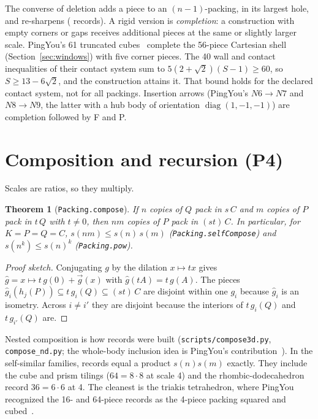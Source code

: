 \documentclass[11pt,a4paper]{article}
\newcommand{\code}[1]{\texttt{\nolinkurl{#1}}}
\newcommand{\lean}[1]{\texttt{#1}}
\newtheorem{theorem}{Theorem}
\theoremstyle{definition}
\theoremstyle{remark}
\begin{document}
The converse of deletion adds a piece to an $(n-1)$-packing, in its largest hole, and re-sharpens (\nAscend{} records). A rigid version is \emph{completion}: a construction with empty corners or gaps receives additional pieces at the same or slightly larger scale. PingYou's 61 truncated cubes~\cite{pingSixteen} complete the 56-piece Cartesian shell (Section~\ref{sec:windows}) with five corner pieces. The 40 wall and contact inequalities of their contact system sum to $5(2+\sqrt2)(S-1)\ge 60$, so $S\ge 13-6\sqrt2$, and the construction attains it. That bound holds for the declared contact system, not for all packings. Insertion arrows (PingYou's $N6\to N7$ and $N8\to N9$, the latter with a hub body of orientation $\operatorname{diag}(1,-1,-1)$) are completion followed by F and P.

\section{Composition and recursion (P4)}\label{sec:compose}

Scales are ratios, so they multiply.

\begin{theorem}[\lean{Packing.compose}]\label{thm:compose}
If $n$ copies of $Q$ pack in $s\,C$ and $m$ copies of $P$ pack in $t\,Q$ with $t\ne 0$, then $nm$ copies of $P$ pack in $(st)\,C$. In particular, for $K=P=Q=C$, $s(nm)\le s(n)\,s(m)$ (\lean{Packing.selfCompose}) and $s(n^k)\le s(n)^k$ (\lean{Packing.pow}).
\end{theorem}

\begin{proof}[Proof sketch]
Conjugating $g$ by the dilation $x\mapsto tx$ gives $\hat g=x\mapsto t\,g(0)+\vec g(x)$ with $\hat g(tA)=t\,g(A)$. The pieces $\hat g_i(h_j(P))\subseteq t\,g_i(Q)\subseteq (st)\,C$ are disjoint within one $g_i$ because $\hat g_i$ is an isometry. Across $i\ne i'$ they are disjoint because the interiors of $t\,g_i(Q)$ and $t\,g_{i'}(Q)$ are.
\end{proof}

Nested composition is how \nNested{} records were built (\code{scripts/compose3d.py}, \code{compose\_nd.py}; the whole-body inclusion idea is PingYou's contribution~\cite{ping79}). In the self-similar families, \nComposites{} records equal a product $s(n)s(m)$ exactly. They include the cube and prism tilings ($64=8\cdot 8$ at scale 4) and the rhombic-dodecahedron record $36=6\cdot6$ at 4. The cleanest is the triakis tetrahedron, where PingYou recognized the 16- and 64-piece records as the 4-piece packing squared and cubed~\cite{pingSixteen}.
\end{document}
